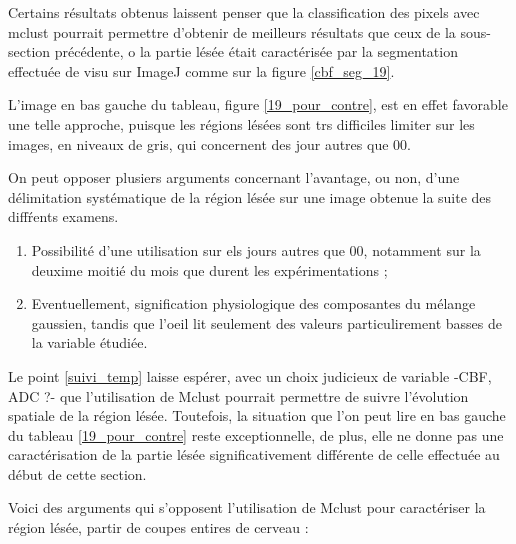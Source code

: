 
Certains r\'esultats obtenus laissent penser que la classification des pixels avec mclust pourrait permettre d'obtenir de meilleurs r\'esultats que ceux de la sous-section pr\'ec\'edente, %
o la partie l\'es\'ee \'etait caract\'eris\'ee par la segmentation effectu\'ee de visu sur ImageJ comme sur la figure \ref{cbf_seg_19}.

\par
L'image en bas  gauche du tableau, figure \ref{19_pour_contre}, est en effet favorable  une telle approche, %
puisque les r\'egions l\'es\'ees sont trs difficiles  limiter sur les images, en niveaux de gris, qui concernent des jour autres que 00.

\par
On peut opposer plusiers arguments concernant l'avantage, ou non, %
d'une d\'elimitation syst\'ematique de la r\'egion l\'es\'ee sur une image obtenue  la suite des diff\'rents examens.
\begin{enumerate}[label=\textbf{(Pour\arabic*)}]
\item\label{19_suivi_temp} Possibilit\'e d'une utilisation sur els jours autres que 00, notamment sur la deuxime moiti\'e du mois que durent les exp\'erimentations ;
\item\label{phy_gau} Eventuellement, signification physiologique des composantes du m\'elange gaussien, %
tandis que l'oeil lit seulement des valeurs particulirement basses de la variable \'etudi\'ee.
\end{enumerate}

Le point \ref{suivi_temp} laisse esp\'erer, avec un choix judicieux de variable -CBF, ADC ?- %
que l'utilisation de Mclust pourrait permettre de suivre l'\'evolution spatiale de la r\'egion l\'es\'ee. %
Toutefois, la situation que l'on peut lire en bas  gauche du tableau \ref{19_pour_contre} reste exceptionnelle, %
de plus, elle ne donne pas une caract\'erisation de la partie l\'es\'ee significativement diff\'erente de celle effectu\'ee au d\'ebut de cette section.

\etoile
Voici des arguments qui s'opposent  l'utilisation de Mclust pour caract\'eriser la r\'egion l\'es\'ee,  partir de coupes entires de cerveau :

